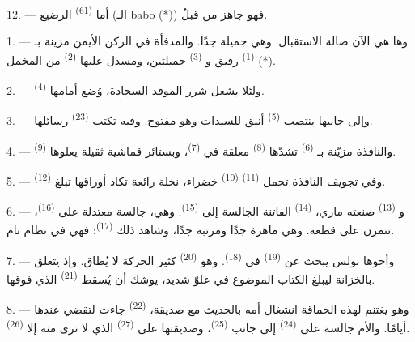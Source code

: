 12. --- أما  \textsuperscript{(61)} الرضيع (الـ babo (*)) فهو جاهز
من قبلُ.

\VUsaut{5.0mm}
\VUsaut{3.0mm}

1. --- وها هي الآن صالة الاستقبال. وهي  جميلة جدًا. والمدفأة
في الركن الأيمن مزينة بـ \textsuperscript{(1)} رقيق
و \textsuperscript{(3)} جميلتين، ومسدل عليها 
\textsuperscript{(2)} من المخمل (*).

2. --- ولئلا يشعل شرر الموقد السجادة، وُضع أمامها 
\textsuperscript{(4)}.

3. --- وإلى جانبها ينتصب  \textsuperscript{(5)} أنيق للسيدات وهو
مفتوح. وفيه تكتب  \textsuperscript{(23)} رسائلها.

4. --- والنافذة مزيّنة بـ \textsuperscript{(6)} تشدّها
 \textsuperscript{(8)} معلقة في 
\textsuperscript{(7)}، وبستائر قماشية ثقيلة يعلوها 
\textsuperscript{(9)}.

5. --- وفي تجويف النافذة تحمل  \textsuperscript{(11)}
 \textsuperscript{(10)} خضراء، نخلة رائعة تكاد أوراقها تبلغ
 \textsuperscript{(12)}.

6. --- و \textsuperscript{(13)} صنعته ماري،
 \textsuperscript{(14)} الفاتنة الجالسة إلى 
\textsuperscript{(15)}. وهي، جالسة معتدلة على  \textsuperscript{(16)}،
تتمرن على قطعة. وهي ماهرة جدًا ومرتبة جدًا، وشاهد ذلك  \textsuperscript{(17)}: فهي في نظام تام.

\VUsaut{5.0mm}
\VUsaut{3.0mm}

7. --- وأخوها بولس يبحث عن  \textsuperscript{(19)} في
 \textsuperscript{(18)}. وهو  \textsuperscript{(20)}
كثير الحركة لا يُطاق. وإذ يتعلق بالخزانة ليبلغ الكتاب الموضوع في علوّ
شديد، يوشك أن يُسقط  \textsuperscript{(21)} الذي فوقها.

8. --- وهو يغتنم لهذه الحماقة انشغال أمه بالحديث مع صديقة، 
\textsuperscript{(22)} جاءت لتقضي عندها أيامًا. والأم جالسة على 
\textsuperscript{(24)} إلى جانب  \textsuperscript{(25)}،
وصديقتها على  \textsuperscript{(27)} الذي لا نرى منه إلا
 \textsuperscript{(26)}.

